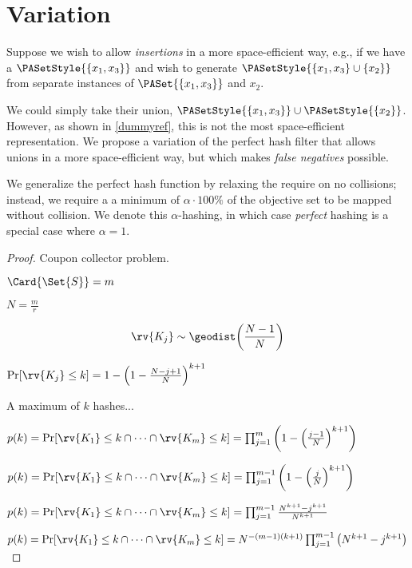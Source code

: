 \documentclass[ ../main.tex]{subfiles}
\begin{document}
\section{Variation}

Suppose we wish to allow \emph{insertions} in a more space-efficient way, e.g., if we have a $\PASetStyle{\{x_1,x_3\}}$ and wish to generate $\PASetStyle{\{x_1,x_3\} \cup \{x_2\}}$ from separate instances of $\PASet{\{x_1,x_3\}}$ and $x_2$.



We could simply take their union, $\PASetStyle{\{x_1,x_3\}} \cup \PASetStyle{\{x_2\}}$. 
However, as shown in \cref{dummyref}, this is not the most space-efficient representation. 
We propose a variation of the perfect hash filter that allows unions in a more space-efficient way, but which makes \emph{false negatives} possible.

We generalize the perfect hash function by relaxing the require on no collisions;
instead, we require a a minimum of $\alpha \cdot 100 \%$ of the objective set to be mapped without collision.
We denote this $\alpha$-hashing, in which case \emph{perfect} hashing is a special case where $\alpha=1$.

\begin{proof}
Coupon collector problem.

$\Card{\Set{S}} = m$

$N = \frac{m}{r}$

\begin{equation}
    \rv{K_j} \sim \geodist\!\left(\frac{N-1}{N}\right)
\end{equation}


$\Pr[\rv{K_j} \leq k] = 1 - \left(1 - \frac{N-j+1}{N}\right)^{k+1}$

A maximum of $k$ hashes...

$p(k) = \Pr[\rv{K_1} \leq k \cap \cdots \cap \rv{K_m} \leq k] = \prod_{j=1}^{m}\left(1 - \left(\frac{j-1}{N}\right)^{k+1}\right)$

$p(k) = \Pr[\rv{K_1} \leq k \cap \cdots \cap \rv{K_m} \leq k] = \prod_{j=1}^{m-1}\left(1 - \left(\frac{j}{N}\right)^{k+1}\right)$


$p(k) = \Pr[\rv{K_1} \leq k \cap \cdots \cap \rv{K_m} \leq k] = \prod_{j=1}^{m-1}\frac{N^{k+1} - j^{k+1}}{N^{k+1}}$


$p(k) = \Pr[\rv{K_1} \leq k \cap \cdots \cap \rv{K_m} \leq k] = N^{-(m-1)(k+1)} \prod_{j=1}^{m-1}\left(N^{k+1} - j^{k+1}\right)$


\end{proof}
\end{document}
